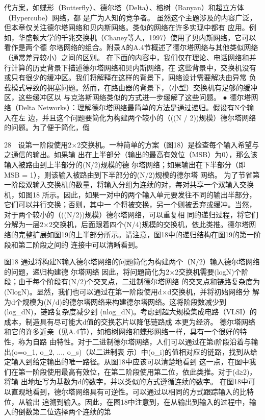 代方案，如蝶形（Butterfly）、德尔塔（Delta）、榕树（Banyan）和超立方体（Hypercube）网络，都
是广为人知的竞争者。
虽然这个主题涉及的内容广泛，但本章仅关注德尔塔网络和贝内斯网络。类似的网络在许多实现中都有
应用。例如，华盛顿大学的千兆交换机（Chaney等人，1997）使用了贝内斯网络，它可以看作是两个德
尔塔网络的组合。附录A的A.4节概述了德尔塔网络与其他类似网络（通常差异较小）之间的区别。
在下面的内容中，我们仅在理论、电话网络和并行计算的历史背景下描述德尔塔网络和贝内斯网络，在
这些背景中，交换机没有或只有很少的缓冲区。我们将解释在这样的背景下，网络设计需要解决由异常
负载模式导致的拥塞问题。然而，在路由器的背景下，（小型）交换机有足够的缓冲区，这些缓冲区以
与克洛斯网络类似的方式进一步缓解了这些问题。
  ● 德尔塔网络（Delta Networks）：理解德尔塔网络最简单的方法是通过递归。假设有N个输入在左
    边，并且这个问题要简化为构建两个较小的（((N / 2))规模）德尔塔网络的问题。为了便于简化，假

                                                             28
  设第一阶段使用2×2交换机。一种简单的方案（图18）是检查每个输入希望与之通信的输出。如果输
  出在上半部分（输出的最高有效位（MSB）为0），那么该输入被路由到上半部分的(N/2)规模的德
  尔塔网络；如果输出在下半部分（即MSB = 1），则该输入被路由到下半部分的(N/2)规模的德尔塔
  网络。
为了节省第一阶段双输入交换机的数量，将输入分组为连续的对，每对共享一个双输入交换机，如图18
所示。因此，如果一对中的两个输入单元要发往不同的输出半部分，它们可以并行交换；否则，其中一
个将被交换，另一个则被丢弃或缓冲。当然，对于两个较小的（((N/2))规模）德尔塔网络，可以重复相
同的递归过程，将它们分解为一层2×2交换机，后面跟着四个(N/4)规模的交换机，依此类推。德尔塔网
络的完整扩展如图19的上半部分所示。请注意，图18中的递归结构在图19的第一阶段和第二阶段之间的
连接中可以清晰看到。




图18 通过将构建N输入德尔塔网络的问题简化为构建两个（N/2）输入德尔塔网络的问题，递归构建德
尔塔网络
因此，将问题简化为2×2交换机需要(logN)个阶段；由于每个阶段有(N/2)个交叉点，二进制德尔塔网络
的交叉点和链路复杂度为(NlogN)。显然，我们也可以通过在第一阶段使用d×d交换机，并将初始网络分
解为d个规模为(N/d)的德尔塔网络来构建德尔塔网络。这将阶段数减少到(log_dN)，链路复杂度减少到
(nlog_dN)。考虑到超大规模集成电路（VLSI）的成本，制造具有尽可能大d值的交换芯片以降低链路成
本更为经济。
德尔塔网络和它的许多近亲（见A.4节），如榕树网络和蝶形网络一样，具有一个很好的特性，称为自路
由特性。对于二进制德尔塔网络，人们可以通过在第i阶段沿着与输出(o=o_1, o_2, ..., o_s)（以二进制表
示）中(o_i)的值相对应的链路，找到从给定输入到给定输出的唯一路径。从图18中应该可以清楚地看到
这一点，在图中我们在第一阶段使用最高有效位，在第二阶段使用第二位，依此类推。对于(d≥2)，将输
出地址写为基数为d的数字，并以类似的方式遵循连续的数字。
在图18中可以直观地看到，德尔塔网络具有可逆性。可以通过以相同的方式跟踪输入的比特位，从输出
追溯到输入。因此，在图18中注意到，在从输出到输入的过程中，输入的倒数第二位选择两个连续的第

